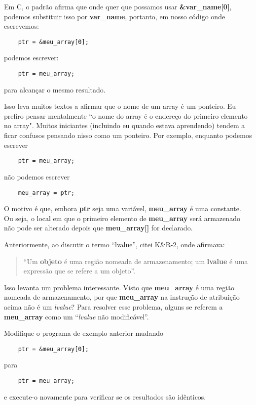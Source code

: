 Em C, o padrão afirma que onde quer que possamos usar \textbf{\&var\_name[0]}, podemos substituir isso por \textbf{var\_name}, portanto, em nosso código onde escrevemos:
\begin{lstlisting}
	ptr = &meu_array[0];
\end{lstlisting}
podemos escrever:
\begin{lstlisting}
	ptr = meu_array;
\end{lstlisting}
para alcançar o mesmo resultado.

Isso leva muitos textos a afirmar que o nome de um array é um ponteiro. Eu prefiro pensar mentalmente ``o nome do array é o endereço do primeiro elemento no array". Muitos iniciantes (incluindo eu quando estava aprendendo) tendem a ficar confusos pensando nisso como um ponteiro. Por exemplo, enquanto podemos escrever
\begin{lstlisting}
	ptr = meu_array;
\end{lstlisting}
não podemos escrever
\begin{lstlisting}
	meu_array = ptr;
\end{lstlisting}

O motivo é que, embora \textbf{ptr} seja uma variável, \textbf{meu\_array} é uma constante. Ou seja, o local em que o primeiro elemento de \textbf{meu\_array} será armazenado não pode ser alterado depois que \textbf{meu\_array[]} for declarado.

Anteriormente, ao discutir o termo ``lvalue'', citei K\&R-2, onde afirmava:

\begin{quotation}
	``Um \textbf{objeto} é uma região nomeada de armazenamento; um \textbf{lvalue} é uma expressão que se refere a um objeto''.
\end{quotation}

Isso levanta um problema interessante. Visto que \textbf{meu\_array} é uma região nomeada de armazenamento, por que \textbf{meu\_array} na instrução de atribuição acima não é um \textit{lvalue}? Para resolver esse problema, alguns se referem a \textbf{meu\_array} como um ``\textit{lvalue} não modificável''.

Modifique o programa de exemplo anterior mudando
\begin{lstlisting}
	ptr = &meu_array[0];
\end{lstlisting}
para
\begin{lstlisting}
	ptr = meu_array;
\end{lstlisting}
e execute-o novamente para verificar se os resultados são idênticos.

